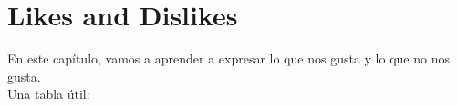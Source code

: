 \chapter{Likes and Dislikes}

En este capítulo, vamos a aprender a expresar lo que nos gusta y lo que no nos gusta. \\

Una tabla útil:

